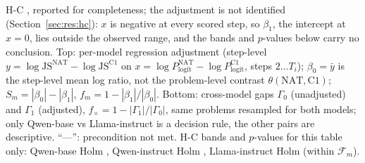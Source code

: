 \begin{table}[!htbp]
\caption{H-C \tagC{}, reported for completeness; the adjustment is not identified (Section~\ref{sec:res:hc}): $x$ is negative at every scored step, so $\beta_1$, the intercept at $x=0$, lies outside the observed range, and the bands and $p$-values below carry no conclusion. Top: per-model regression adjustment (step-level $y=\log\mathrm{JS}^{\mathrm{NAT}}-\log\mathrm{JS}^{\mathrm{C1}}$ on $x=\log P_{\mathrm{logit}}^{\mathrm{NAT}}-\log P_{\mathrm{logit}}^{\mathrm{C1}}$, steps $2\ldots T_i$); $\beta_0=\bar y$ is the step-level mean log ratio, not the problem-level contrast $\theta(\mathrm{NAT},\mathrm{C1})$; $S_m=|\beta_0|-|\beta_1|$, $f_m=1-|\beta_1|/|\beta_0|$. Bottom: cross-model gaps $\Gamma_0$ (unadjusted) and $\Gamma_1$ (adjusted), $f_\times=1-|\Gamma_1|/|\Gamma_0|$, same problems resampled for both models; only Qwen-base vs Llama-instruct is a decision rule, the other pairs are descriptive. ``---'': precondition not met. H-C bands and $p$-values for this table only: Qwen-base Holm , Qwen-instruct Holm , Llama-instruct Holm  (within $\mathcal{F}_m$).}
\label{tab:hc}
\end{table}
